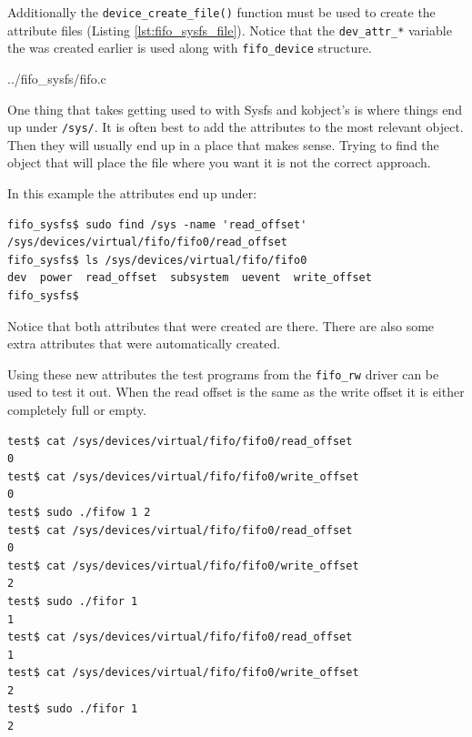 \documentclass{article}
\begin{document}
Additionally the \verb+device_create_file()+ function must be used
to create the attribute files (Listing \ref{lst:fifo_sysfs_file}).
Notice that the \verb+dev_attr_*+ variable the was created earlier
is used along with \verb+fifo_device+ structure.


	{../fifo_sysfs/fifo.c}

One thing that takes getting used to with Sysfs and kobject's is where
things end up under \verb+/sys/+.
It is often best to add the attributes to the most relevant object.
Then they will usually end up in a place that makes sense.
Trying to find the object that will place the file where you want it
is not the correct approach.

In this example the attributes end up under:

\begin{verbatim}
fifo_sysfs$ sudo find /sys -name 'read_offset'
/sys/devices/virtual/fifo/fifo0/read_offset
fifo_sysfs$ ls /sys/devices/virtual/fifo/fifo0
dev  power  read_offset  subsystem  uevent  write_offset
fifo_sysfs$ 
\end{verbatim}

Notice that both attributes that were created are there.
There are also some extra attributes that were automatically
created.

Using these new attributes the test programs from the \verb+fifo_rw+
driver can be used to test it out.  When the read offset is the
same as the write offset it is either completely full or empty.

\begin{verbatim}
test$ cat /sys/devices/virtual/fifo/fifo0/read_offset 
0
test$ cat /sys/devices/virtual/fifo/fifo0/write_offset 
0
test$ sudo ./fifow 1 2
test$ cat /sys/devices/virtual/fifo/fifo0/read_offset 
0
test$ cat /sys/devices/virtual/fifo/fifo0/write_offset 
2
test$ sudo ./fifor 1
1
test$ cat /sys/devices/virtual/fifo/fifo0/read_offset 
1
test$ cat /sys/devices/virtual/fifo/fifo0/write_offset 
2
test$ sudo ./fifor 1
2
\end{verbatim}


\pagebreak
\printbibliography

\end{document}

